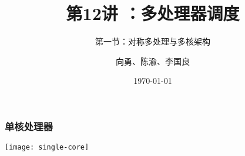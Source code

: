 


\title[第12讲]{第12讲 ：多处理器调度} %
\subtitle{第一节：对称多处理与多核架构}
\author{向勇、陈渝、李国良} %
\date{\today} %




\begin{frame}
\titlepage %
\end{frame}

%
%

\begin{frame}[fragile]
    \frametitle{单核处理器}	
    \centering
    \texttt{[image: single-core]}
		
\end{frame}

